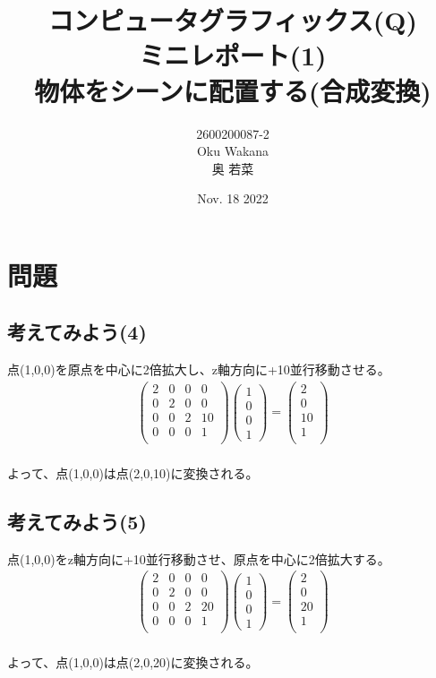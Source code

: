 \documentclass[dvipdfmx,autodetect-engine,titlepage]{jsarticle}
\title{コンピュータグラフィックス(Q)\\
ミニレポート(1)\\
物体をシーンに配置する(合成変換)\\
}
\author{2600200087-2\\Oku Wakana\\奥 若菜}
\date{Nov. 18 2022}
\begin{document}
\maketitle

\section*{問題}
\subsection*{考えてみよう(4)}
点(1,0,0)を原点を中心に2倍拡大し、z軸方向に+10並行移動させる。\\
\begin{eqnarray*}
  \begin{pmatrix}
    2 & 0 & 0 & 0 \\
    0 & 2 & 0 & 0 \\
    0 & 0 & 2 & 10 \\
    0 & 0 & 0 & 1 \\
  \end{pmatrix} 
  \begin{pmatrix}
    1 \\ 
    0 \\ 
    0 \\ 
    1 
  \end{pmatrix}
  = \begin{pmatrix}
    2 \\ 
    0 \\ 
    10 \\ 
    1 \\
  \end{pmatrix}
\end{eqnarray*}
　\\
よって、点(1,0,0)は点(2,0,10)に変換される。\\


\subsection*{考えてみよう(5)}
点(1,0,0)をz軸方向に+10並行移動させ、原点を中心に2倍拡大する。\\
\begin{eqnarray*}
  \begin{pmatrix}
    2 & 0 & 0 & 0 \\
    0 & 2 & 0 & 0 \\
    0 & 0 & 2 & 20 \\
    0 & 0 & 0 & 1 \\
  \end{pmatrix} 
  \begin{pmatrix}
    1 \\ 
    0 \\ 
    0 \\ 
    1 
  \end{pmatrix}
  = \begin{pmatrix}
    2 \\ 
    0 \\ 
    20 \\ 
    1 \\
  \end{pmatrix}
\end{eqnarray*}
　\\
よって、点(1,0,0)は点(2,0,20)に変換される。
\end{document}
